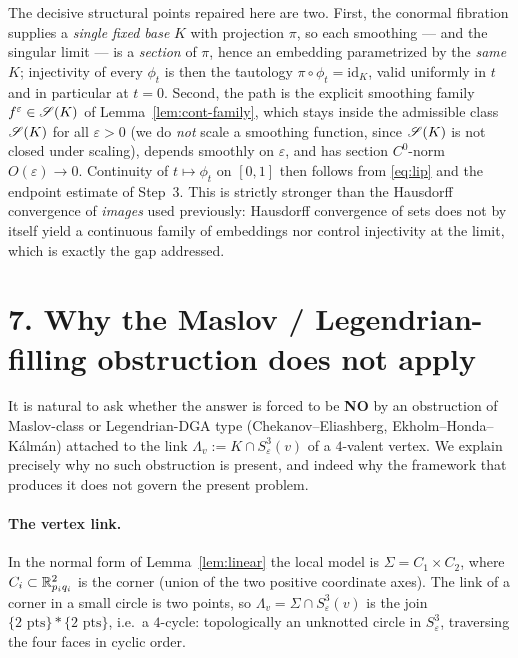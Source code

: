 \begin{qeightremark}
The decisive structural points repaired here are two. First, the conormal
fibration supplies a \emph{single fixed base} $K$ with projection $\pi$, so each
smoothing — and the singular limit — is a \emph{section} of $\pi$, hence an
embedding parametrized by the \emph{same} $K$; injectivity of every $\phi_t$ is
then the tautology $\pi\circ\phi_t=\mathrm{id}_K$, valid uniformly in $t$ and in
particular at $t=0$. Second, the path is the explicit smoothing family
$f^\varepsilon\in\mathscr S(K)$ of Lemma~\ref{lem:cont-family}, which stays inside the
admissible class $\mathscr S(K)$ for all $\varepsilon>0$ (we do \emph{not} scale a
smoothing function, since $\mathscr S(K)$ is not closed under scaling), depends smoothly
on $\varepsilon$, and has section $C^0$-norm $O(\varepsilon)\to0$. Continuity of
$t\mapsto\phi_t$ on $[0,1]$ then follows from \eqref{eq:lip} and the endpoint
estimate of Step~3. This is strictly stronger than the Hausdorff convergence of
\emph{images} used previously: Hausdorff convergence of sets does not by itself
yield a continuous family of embeddings nor control injectivity at the limit,
which is exactly the gap addressed.
\end{qeightremark}


\section*{7. Why the Maslov / Legendrian-filling obstruction does not apply}

It is natural to ask whether the answer is forced to be \textbf{NO} by an
obstruction of Maslov-class or Legendrian-DGA type (Chekanov--Eliashberg,
Ekholm--Honda--K\'alm\'an) attached to the link
$\Lambda_v:=K\cap S^3_\varepsilon(v)$ of a $4$-valent vertex. We explain
precisely why no such obstruction is present, and indeed why the framework that
produces it does not govern the present problem.

\paragraph{The vertex link.} In the normal form of Lemma~\ref{lem:linear} the
local model is $\Sigma=C_1\times C_2$, where $C_i\subset\mathbb{R}^2_{p_iq_i}$ is the
corner (union of the two positive coordinate axes). The link of a corner in a
small circle is two points, so $\Lambda_v=\Sigma\cap S^3_\varepsilon(v)$ is the
join $\{2\text{ pts}\}*\{2\text{ pts}\}$, i.e.\ a $4$-cycle: topologically an
unknotted circle in $S^3_\varepsilon$, traversing the four faces in cyclic order.

